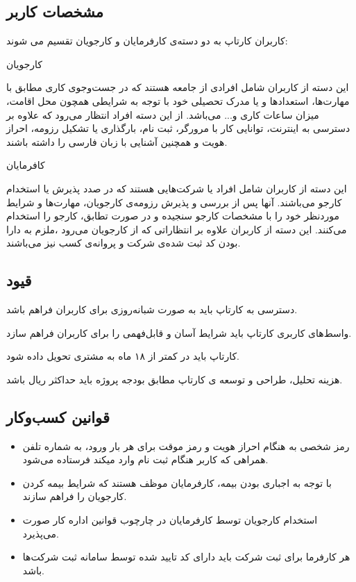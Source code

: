 \documentclass[12pt,svgnames,oneside]{book}
\newcounter{itemadded}
\let\LaTeXStandardEnumerateBegin\enumerate
\let\LaTeXStandardEnumerateEnd\endenumerate
\renewenvironment{enumerate}{%
	\LaTeXStandardEnumerateBegin%
	\setcounter{itemadded}{0}
}{%
	\LaTeXStandardEnumerateEnd%
}%
\begin{document}
			\subsection{مشخصات کاربر}
				کاربران کارتاپ به دو دسته‌ی کارفرمایان و کارجویان تقسیم می شوند:
				\begin{enumerate}
					\item
					کارجویان

					این دسته از کاربران شامل افرادی از جامعه هستند که در جست‌وجوی کاری مطابق با مهارت‌ها، استعدادها و یا مدرک تحصیلی خود با توجه به شرایطی همچون محل اقامت، میزان ساعات کاری و... می‌باشد. از این دسته افراد انتظار می‌رود که علاوه بر دسترسی به اینترنت، توانایی کار با مرورگر، ثبت نام، بارگذاری یا تشکیل رزومه، احراز هویت و همچنین آشنایی با زبان فارسی را داشته باشند.
					\item
					 کافرمایان

					این دسته از کاربران شامل افراد یا شرکت‌هایی هستند که در صدد پذیرش یا استخدام کارجو می‌باشند. آنها پس از بررسی و پذیرش رزومه‌ی کارجویان، مهارت‌ها و شرایط موردنظر خود را با مشخصات کارجو سنجیده و در صورت تطابق، کارجو را استخدام می‌کنند. این دسته از کاربران علاوه بر انتظاراتی که از کارجویان می‌رود ،ملزم به دارا بودن کد ثبت شده‌ی شرکت و پروانه‌ی کسب نیز می‌باشند.
				\end{enumerate}

			\subsection{قیود}
				\begin{enumerate}
					\item
					دسترسی به کارتاپ باید به صورت شبانه‌روزی برای کاربران فراهم باشد.
					\item
					واسط‌های کاربری کارتاپ باید شرایط آسان و قابل‌فهمی را برای کاربران فراهم سازد.
					\item
					کارتاپ باید در کمتر از ۱۸ ماه به مشتری تحویل داده شود.
					\item
					 هزینه تحلیل، طراحی و توسعه ی کارتاپ مطابق بودجه پروژه باید حداکثر  ریال باشد.
				\end{enumerate}
			\subsection{قوانین کسب‌و‌کار}
				\begin{itemize}
					\item
					رمز شخصی به هنگام احراز هویت و رمز موقت برای هر بار ورود، به شماره تلفن همراهی که کاربر هنگام ثبت نام وارد میکند فرستاده می‌شود.
					\item
					با توجه به اجباری بودن بیمه، کارفرمایان موظف هستند که شرایط بیمه کردن کارجویان را فراهم سازند.
					\item
					استخدام کارجویان توسط کارفرمایان در چارچوب قوانین اداره کار صورت می‌پذیرد.
					\item
					هر کارفرما برای ثبت شرکت باید دارای کد تایید شده توسط سامانه ثبت شرکت‌ها باشد.
				\end{itemize}
\end{document}
